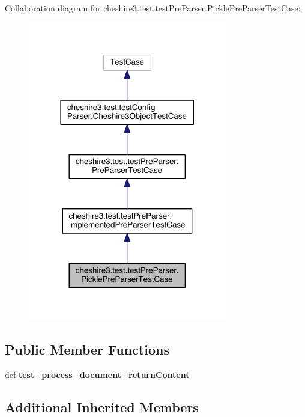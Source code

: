 Collaboration diagram for cheshire3.\-test.\-test\-Pre\-Parser.\-Pickle\-Pre\-Parser\-Test\-Case\-:
\nopagebreak
\begin{figure}[H]
\begin{center}
\leavevmode
\includegraphics[width=246pt]{classcheshire3_1_1test_1_1test_pre_parser_1_1_pickle_pre_parser_test_case__coll__graph}
\end{center}
\end{figure}
\subsection*{Public Member Functions}
\begin{DoxyCompactItemize}
\item 
\hypertarget{classcheshire3_1_1test_1_1test_pre_parser_1_1_pickle_pre_parser_test_case_a8151424c7ce3ed6301790a2f233937f1}{def {\bfseries test\-\_\-process\-\_\-document\-\_\-return\-Content}}\label{classcheshire3_1_1test_1_1test_pre_parser_1_1_pickle_pre_parser_test_case_a8151424c7ce3ed6301790a2f233937f1}

\end{DoxyCompactItemize}
\subsection*{Additional Inherited Members}


